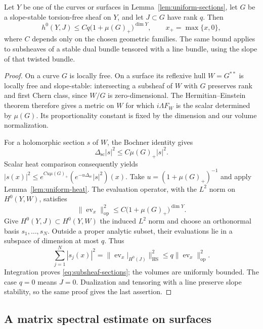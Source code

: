 \begin{lemma}\label{lem:subsheaf-sections}
Let $Y$ be one of the curves or surfaces in
Lemma~\ref{lem:uniform-sections}, let $G$ be a slope-stable
torsion-free sheaf on $Y$, and let $J\subset G$ have rank $q$.
Then
\begin{equation}\label{eq:subsheaf-sections}
 h^0(Y,J)\le Cq\bigl(1+\mu(G)_+\bigr)^{\dim Y},
 \qquad x_+=\max\{x,0\},
\end{equation}
where $C$ depends only on the chosen geometric families.  The same
bound applies to subsheaves of a stable dual bundle tensored with
a line bundle, using the slope of that twisted bundle.
\end{lemma}

\begin{proof}
On a curve $G$ is locally free.  On a surface its reflexive hull
$W=G^{**}$ is locally free and slope-stable: intersecting a
subsheaf of $W$ with $G$ preserves rank and first Chern class, since
$W/G$ is zero-dimensional.  The Hermitian--Einstein theorem
\cite{Donaldson1985,UhlenbeckYau1986} therefore gives a metric on
$W$ for which $i\Lambda F_W$ is the scalar determined by
$\mu(G)$.  Its proportionality constant is fixed by the dimension
and our volume normalization.

For a holomorphic section $s$ of $W$, the Bochner identity gives
\[
 \Delta_{\mathrm{sc}}|s|^2\le C\mu(G)_+|s|^2.
\]
Scalar heat comparison consequently yields
$|s(x)|^2\le e^{C u\mu(G)_+}(e^{-u\Delta_{\mathrm{sc}}}|s|^2)(x)$.
Take $u=(1+\mu(G)_+)^{-1}$ and apply
Lemma~\ref{lem:uniform-heat}.  The evaluation operator, with the
$L^2$ norm on $H^0(Y,W)$, satisfies
\begin{equation}\label{eq:evaluation-operator}
 \|\operatorname{ev}_x\|_{\mathrm{op}}^2
 \le C\bigl(1+\mu(G)_+\bigr)^{\dim Y}.
\end{equation}
Give $H^0(Y,J)\subset H^0(Y,W)$ the induced $L^2$ norm and choose
an orthonormal basis $s_1,\ldots,s_N$.  Outside a proper analytic
subset, their evaluations lie in a subspace of dimension at most
$q$.  Thus
\[
 \sum_{j=1}^N|s_j(x)|^2
 =\|\operatorname{ev}_x|_{H^0(J)}\|_{\mathrm{HS}}^2
 \le q\|\operatorname{ev}_x\|_{\mathrm{op}}^2.
\]
Integration proves \eqref{eq:subsheaf-sections}; the volumes are
uniformly bounded.  The case $q=0$ means $J=0$.  Dualization and
tensoring with a line preserve slope stability, so the same proof
gives the last assertion.
\end{proof}

\subsection{A matrix spectral estimate on surfaces}

